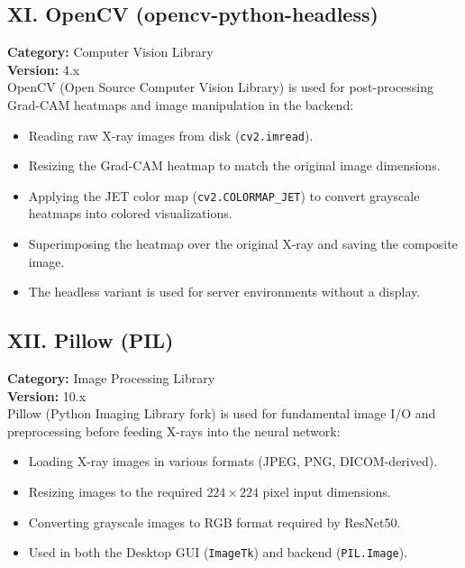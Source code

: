 \documentclass[a4paper,12pt]{report}
\begin{document}
    \subsection*{XI. OpenCV (opencv-python-headless)}
    \textbf{Category:} Computer Vision Library\\
    \textbf{Version:} 4.x\\
    OpenCV (Open Source Computer Vision Library) is used for post-processing Grad-CAM heatmaps and image manipulation in the backend:
    \begin{itemize}
        \item Reading raw X-ray images from disk (\texttt{cv2.imread}).
        \item Resizing the Grad-CAM heatmap to match the original image dimensions.
        \item Applying the JET color map (\texttt{cv2.COLORMAP\_JET}) to convert grayscale heatmaps into colored visualizations.
        \item Superimposing the heatmap over the original X-ray and saving the composite image.
        \item The headless variant is used for server environments without a display.
    \end{itemize}

    \subsection*{XII. Pillow (PIL)}
    \textbf{Category:} Image Processing Library\\
    \textbf{Version:} 10.x\\
    Pillow (Python Imaging Library fork) is used for fundamental image I/O and preprocessing before feeding X-rays into the neural network:
    \begin{itemize}
        \item Loading X-ray images in various formats (JPEG, PNG, DICOM-derived).
        \item Resizing images to the required $224 \times 224$ pixel input dimensions.
        \item Converting grayscale images to RGB format required by ResNet50.
        \item Used in both the Desktop GUI (\texttt{ImageTk}) and backend (\texttt{PIL.Image}).
    \end{itemize}

\end{document}
